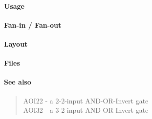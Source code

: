 \paragraph{Usage}

\paragraph{Fan-in / Fan-out}

\paragraph{Layout}

\paragraph{Files}

\paragraph{See also}
\begin{quote}
    AOI22 - a 2-2-input AND-OR-Invert gate \\
    AOI32 - a 3-2-input AND-OR-Invert gate
\end{quote}
